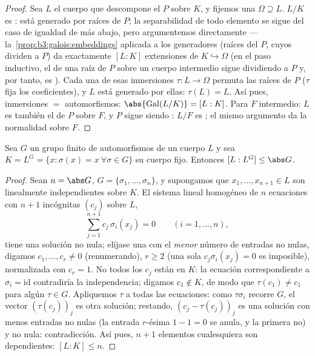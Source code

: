 \begin{proof}
Sea $L$ el cuerpo que descompone el  $P$ sobre $K$, y fijemos una
$\Omega \supseteq L$. $L/K$ es
: está generado por raíces de
$P$; la separabilidad de todo elemento se sigue del caso de igualdad de
más abajo, pero argumentemos directamente ---
la~\cref{prop:b3:galois:embeddings} aplicada a los generadores (raíces
del  $P$, cuyos
 dividen a $P$) da
exactamente $[L:K]$ extensiones de $K \hookrightarrow \Omega$ (en el
paso inductivo, el  de
una raíz de $P$ sobre un cuerpo intermedio sigue dividiendo a $P$ y, por
tanto, es ). Cada una de esas
inmersiones $\tau \colon L \to \Omega$ permuta las raíces de $P$ ($\tau$
fija los coeficientes), y $L$ está generado por ellas: $\tau(L) = L$.
Así pues, inmersiones $=$ automorfismos:
$\abs{\operatorname{Gal}(L/K)} = [L:K]$. Para $F$ intermedio: $L$ es
también el  de
$P$ sobre $F$, y $P$ sigue siendo
: $L/F$ es
; el mismo argumento da la
normalidad sobre $F$.
\end{proof}

\begin{lemma}[Artin]\label{lem:b3:galois:artin}
Sea $G$ un grupo finito de automorfismos de un cuerpo $L$ y sea
$K = L^G = \{x : \sigma(x) = x\ \forall\sigma \in G\}$ su cuerpo fijo.
Entonces $[L : L^G] \leq \abs G$.
\end{lemma}

\begin{proof}
Sean $n = \abs G$, $G = \{\sigma_1, \dots, \sigma_n\}$, y supongamos que
$x_1, \dots, x_{n+1} \in L$ son linealmente independientes sobre $K$. El
sistema lineal homogéneo de $n$ ecuaciones con $n+1$ incógnitas $(c_j)$
sobre $L$,
\[
\sum_{j=1}^{n+1} c_j\,\sigma_i(x_j) = 0
\qquad (i = 1, \dots, n),
\]
tiene una solución no nula; elíjase una con el \emph{menor} número de
entradas no nulas, digamos $c_1, \dots, c_r \neq 0$ (renumerando),
$r \geq 2$ (una sola $c_j\sigma_i(x_j) = 0$ es imposible), normalizada
con $c_r = 1$. No todos los $c_j$ están en $K$: la ecuación
correspondiente a $\sigma_i =
\mathrm{id}$ contradiría la independencia; digamos $c_1 \notin K$, de
modo que $\tau(c_1) \ne c_1$ para algún $\tau \in G$. Apliquemos $\tau$
a todas las ecuaciones: como $\tau\sigma_i$ recorre $G$, el vector
$(\tau(c_j))_j$ es otra solución; restando, $(c_j -
\tau(c_j))_j$ es una solución con menos entradas no nulas (la entrada
$r$-ésima $1 - 1 = 0$ se anula, y la primera no) y no nula:
contradicción. Así pues, $n+1$ elementos cualesquiera son dependientes:
$[L:K]
\leq n$.
\end{proof}

